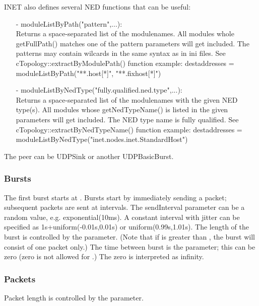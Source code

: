 INET also defines several NED functions that can be useful:
\begin{itemize}
\item[-] moduleListByPath("pattern",...): \\
         Returns a space-separated list of the modulenames.
         All modules whole getFullPath() matches one of the pattern parameters will get included.
         The patterns may contain wilcards in the same syntax as in ini files.
         See cTopology::extractByModulePath() function
         example: destaddresses = moduleListByPath("**.host[*]", "**.fixhost[*]")
\item[-] moduleListByNedType("fully.qualified.ned.type",...): \\
         Returns a space-separated list of the modulenames with the given NED type(s).
         All modules whose getNedTypeName() is listed in the given parameters will get included.
         The NED type name is fully qualified.
         See cTopology::extractByNedTypeName() function
         example: destaddresses = moduleListByNedType("inet.nodes.inet.StandardHost")
\end{itemize}

The peer can be UDPSink or another UDPBasicBurst.

\subsubsection*{Bursts}

The first burst starts at . Bursts start by immediately sending
a packet; subsequent packets are sent at  intervals. The
sendInterval parameter can be a random value, e.g. exponential(10ms).
A constant interval with jitter can be specified as 1s+uniform(-0.01s,0.01s)
or uniform(0.99s,1.01s). The length of the burst is controlled by the
 parameter. (Note that if  is greater than
, the burst will consist of one packet only.) The time between
burst is the  parameter; this can be zero (zero is not
allowed for .) The zero  is interpreted as infinity.

\subsubsection*{Packets}

Packet length is controlled by the  parameter.

